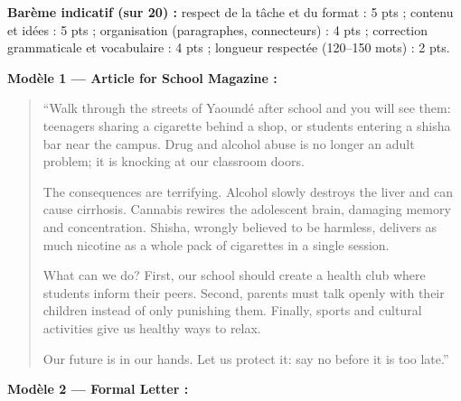 \documentclass[11pt]{article}
\begin{document}
\begin{corrige}
\textbf{Barème indicatif (sur 20) :} respect de la tâche et du format : 5 pts ; contenu et idées : 5 pts ; organisation (paragraphes, connecteurs) : 4 pts ; correction grammaticale et vocabulaire : 4 pts ; longueur respectée (120--150 mots) : 2 pts.

\textbf{Modèle 1 — Article for School Magazine :}

\begin{quote}
“Walk through the streets of Yaoundé after school and you will see them: teenagers sharing a cigarette behind a shop, or students entering a shisha bar near the campus. Drug and alcohol abuse is no longer an adult problem; it is knocking at our classroom doors.

The consequences are terrifying. Alcohol slowly destroys the liver and can cause cirrhosis. Cannabis rewires the adolescent brain, damaging memory and concentration. Shisha, wrongly believed to be harmless, delivers as much nicotine as a whole pack of cigarettes in a single session.

What can we do? First, our school should create a health club where students inform their peers. Second, parents must talk openly with their children instead of only punishing them. Finally, sports and cultural activities give us healthy ways to relax.

Our future is in our hands. Let us protect it: say no before it is too late.”
\end{quote}

\textbf{Modèle 2 — Formal Letter :}


\end{corrige}
\end{document}
